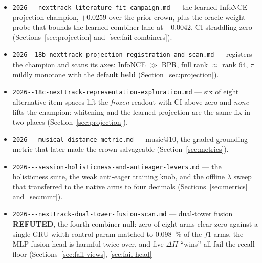 \documentclass[11pt]{article}
\begin{document}
\begin{itemize}
  sweep: the pooled ANN twin loses to the same-space GRU
  ($-\num{0.0245}$, CI below zero) and the XGBoost stacker lands below its own
  base leg (Sections~\ref{sec:recurrence} and~\ref{sec:fail-combiners}).
  \item \texttt{2026---\allowbreak nexttrack-\allowbreak literature-\allowbreak fit-\allowbreak campaign.md} --- the learned
  InfoNCE projection champion, $+\num{0.0259}$ over the prior crown, plus the
  oracle-weight probe that bounds the learned-combiner lane at $+\num{0.0042}$,
  CI straddling zero (Sections~\ref{sec:projection}
  and~\ref{sec:fail-combiners}).
  \item \texttt{2026--\allowbreak 18b-\allowbreak nexttrack-\allowbreak projection-\allowbreak registration-\allowbreak and-\allowbreak scan.md} ---
  registers the champion and scans its axes: InfoNCE $\gg$ BPR, full rank
  $\approx$ rank 64, $\tau$ mildly monotone with the default \textbf{held}
  (Section~\ref{sec:projection}).
  \item \texttt{2026--\allowbreak 18c-\allowbreak nexttrack-\allowbreak representation-\allowbreak exploration.md} --- six of
  eight alternative item spaces lift the \emph{frozen} readout with CI above
  zero and \emph{none} lifts the champion: whitening and the learned projection
  are the same fix in two places (Section~\ref{sec:projection}).
  \item \texttt{2026---\allowbreak musical-\allowbreak distance-\allowbreak metric.md} --- music@10, the graded
  grounding metric that later made the crown salvageable
  (Section~\ref{sec:metrics}).
  \item \texttt{2026---\allowbreak session-\allowbreak holisticness-\allowbreak and-\allowbreak antieager-\allowbreak levers.md} --- the
  holisticness suite, the weak anti-eager training knob, and the offline
  $\lambda$ sweep that transferred to the native arms to four decimals
  (Sections~\ref{sec:metrics} and~\ref{sec:mmr}).
  \item \texttt{2026---\allowbreak nexttrack-\allowbreak dual-\allowbreak tower-\allowbreak fusion-\allowbreak scan.md} --- dual-tower
  fusion \textbf{REFUTED}, the fourth combiner null: zero of eight arms clear
  zero against a single-GRU width control param-matched to \SI{0.098}{\percent} of
  the $f1$ arms, the MLP fusion
  head is harmful twice over, and five $\Delta H$ ``wins'' all fail the recall
  floor (Sections~\ref{sec:fail-views}, \ref{sec:fail-head}

\end{itemize}
\end{document}
